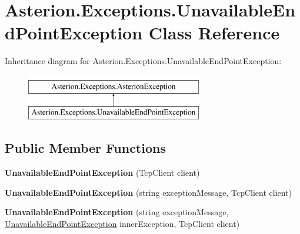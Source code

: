 \hypertarget{classAsterion_1_1Exceptions_1_1UnavailableEndPointException}{\section{Asterion.\-Exceptions.\-Unavailable\-End\-Point\-Exception Class Reference}
\label{classAsterion_1_1Exceptions_1_1UnavailableEndPointException}
}
Inheritance diagram for Asterion.\-Exceptions.\-Unavailable\-End\-Point\-Exception\-:\begin{figure}[H]
\begin{center}
\leavevmode
\includegraphics[height=2.000000cm]{classAsterion_1_1Exceptions_1_1UnavailableEndPointException}
\end{center}
\end{figure}
\subsection*{Public Member Functions}
\begin{DoxyCompactItemize}
\item 
\hypertarget{classAsterion_1_1Exceptions_1_1UnavailableEndPointException_a573ecc850c7744c0c1784273643eb805}{{\bfseries Unavailable\-End\-Point\-Exception} (Tcp\-Client client)}\label{classAsterion_1_1Exceptions_1_1UnavailableEndPointException_a573ecc850c7744c0c1784273643eb805}

\item 
\hypertarget{classAsterion_1_1Exceptions_1_1UnavailableEndPointException_a8233ece9b0ecedc04b0a47bb8f195c5a}{{\bfseries Unavailable\-End\-Point\-Exception} (string exception\-Message, Tcp\-Client client)}\label{classAsterion_1_1Exceptions_1_1UnavailableEndPointException_a8233ece9b0ecedc04b0a47bb8f195c5a}

\item 
\hypertarget{classAsterion_1_1Exceptions_1_1UnavailableEndPointException_a165026b4897f5b0a2cb77caf1db46e59}{{\bfseries Unavailable\-End\-Point\-Exception} (string exception\-Message, \hyperlink{classAsterion_1_1Exceptions_1_1UnavailableEndPointException}{Unavailable\-End\-Point\-Exception} inner\-Exception, Tcp\-Client client)}\label{classAsterion_1_1Exceptions_1_1UnavailableEndPointException_a165026b4897f5b0a2cb77caf1db46e59}

\end{DoxyCompactItemize}

